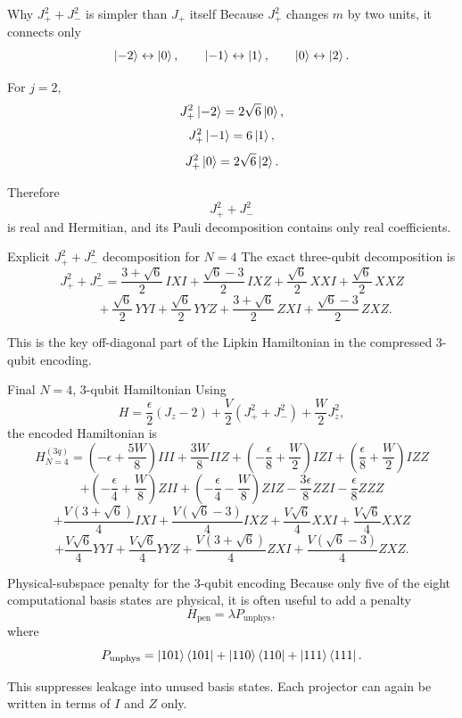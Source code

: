 \documentclass[aspectratio=169]{beamer}
\begin{document}
\begin{frame}{Why \(J_+^2+J_-^2\) is simpler than \(J_+\) itself}
Because \(J_+^2\) changes \(m\) by two units, it connects only
\[
\ket{-2}\leftrightarrow \ket{0},
\qquad
\ket{-1}\leftrightarrow \ket{1},
\qquad
\ket{0}\leftrightarrow \ket{2}.
\]

For \(j=2\),
\[
J_+^2\ket{-2}=2\sqrt{6}\ket{0},
\]
\[
J_+^2\ket{-1}=6\ket{1},
\]
\[
J_+^2\ket{0}=2\sqrt{6}\ket{2}.
\]

Therefore
\[
J_+^2+J_-^2
\]
is real and Hermitian, and its Pauli decomposition contains only real coefficients.
\end{frame}

\begin{frame}{Explicit \(J_+^2+J_-^2\) decomposition for \(N=4\)}
The exact three-qubit decomposition is
\[
J_+^2+J_-^2
=
\frac{3+\sqrt{6}}{2}\,IXI
+
\frac{\sqrt{6}-3}{2}\,IXZ
+
\frac{\sqrt{6}}{2}\,XXI
+
\frac{\sqrt{6}}{2}\,XXZ
\]
\[
\qquad
+
\frac{\sqrt{6}}{2}\,YYI
+
\frac{\sqrt{6}}{2}\,YYZ
+
\frac{3+\sqrt{6}}{2}\,ZXI
+
\frac{\sqrt{6}-3}{2}\,ZXZ.
\]

This is the key off-diagonal part of the Lipkin Hamiltonian in the compressed 3-qubit encoding.
\end{frame}

\begin{frame}{Final \(N=4\), 3-qubit Hamiltonian}
Using
\[
H = \frac{\epsilon}{2}(J_z-2) + \frac{V}{2}(J_+^2+J_-^2) + \frac{W}{2}J_z^2,
\]
the encoded Hamiltonian is
\[
H_{N=4}^{(3q)}
=
\left(-\epsilon+\frac{5W}{8}\right)III
+\frac{3W}{8}IIZ
+\left(-\frac{\epsilon}{8}+\frac{W}{2}\right)IZI
+\left(\frac{\epsilon}{8}+\frac{W}{2}\right)IZZ
\]
\[
+\left(-\frac{\epsilon}{4}+\frac{W}{8}\right)ZII
+\left(-\frac{\epsilon}{4}-\frac{W}{8}\right)ZIZ
-\frac{3\epsilon}{8}ZZI
-\frac{\epsilon}{8}ZZZ
\]
\[
+\frac{V(3+\sqrt{6})}{4}IXI
+\frac{V(\sqrt{6}-3)}{4}IXZ
+\frac{V\sqrt{6}}{4}XXI
+\frac{V\sqrt{6}}{4}XXZ
\]
\[
+\frac{V\sqrt{6}}{4}YYI
+\frac{V\sqrt{6}}{4}YYZ
+\frac{V(3+\sqrt{6})}{4}ZXI
+\frac{V(\sqrt{6}-3)}{4}ZXZ.
\]
\end{frame}

\begin{frame}{Physical-subspace penalty for the 3-qubit encoding}
Because only five of the eight computational basis states are physical, it is often useful to add a penalty
\[
H_{\mathrm{pen}} = \lambda P_{\mathrm{unphys}},
\]
where
\[
P_{\mathrm{unphys}}
=
\ket{101}\bra{101}
+\ket{110}\bra{110}
+\ket{111}\bra{111}.
\]

This suppresses leakage into unused basis states.
Each projector can again be written in terms of \(I\) and \(Z\) only.
\end{frame}
\end{document}
